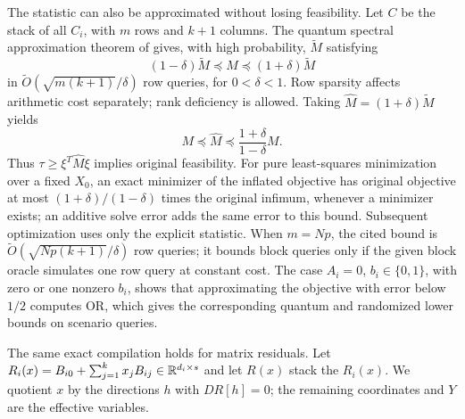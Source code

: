 The statistic can also be approximated without losing feasibility.  Let $C$ be the stack of
all $C_i$, with $m$ rows and $k+1$ columns.  The quantum spectral
approximation theorem of \citet[Theorem~3.1]{ApersGribling2026} gives, with
high probability, $\widetilde M$ satisfying
\[
 (1-\delta)\widetilde M\preceq M\preceq(1+\delta)\widetilde M
\]
in $\widetilde O(\sqrt{m(k+1)}/\delta)$ row queries, for $0<\delta<1$.
Row sparsity affects arithmetic cost separately; rank deficiency is allowed.
Taking $\widehat M=(1+\delta)\widetilde M$ yields
\begin{equation}\label{eq:projected-gram-inflation}
 M\preceq\widehat M\preceq\frac{1+\delta}{1-\delta}M.
\end{equation}
Thus $\tau\geq\xi^T\widehat M\xi$ implies original feasibility.
For pure least-squares minimization over a fixed $X_0$, an exact minimizer
of the inflated objective has original objective at most
$(1+\delta)/(1-\delta)$ times the original infimum, whenever a minimizer
exists; an additive solve error adds the same error to this bound.
Subsequent optimization uses only the explicit statistic.  When $m=Np$,
the cited bound is $\widetilde O(\sqrt{Np(k+1)}/\delta)$ row queries;
it bounds block queries only if the given block oracle simulates one row
query at constant cost.  The case $A_i=0$, $b_i\in\{0,1\}$, with zero or
one nonzero $b_i$, shows that approximating the objective with error
below $1/2$ computes OR, which gives the corresponding quantum and
randomized lower bounds on scenario queries.

The same exact compilation holds for matrix residuals.  Let
$R_i(x)=B_{i0}+\sum_{j=1}^k x_jB_{ij}\in\mathbb R^{d_i\times s}$ and let
$R(x)$ stack the $R_i(x)$.  We quotient $x$ by the directions $h$ with
$DR[h]=0$; the remaining coordinates and $Y$ are the effective variables.

